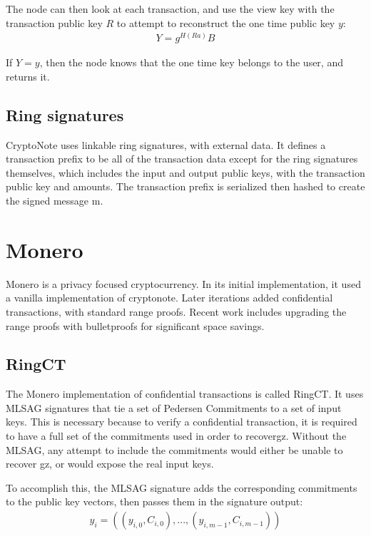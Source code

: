 \documentclass{article}
\begin{document}
The node can then look at each transaction, and use the view key with the transaction public key $R$ to attempt to reconstruct the one time public key $y$:
\begin{eqnarray}
  Y = g^{H(Ra)} B
\end{eqnarray}

If $Y = y$, then the node knows that the one time key belongs to the user, and returns it.


\subsection{Ring signatures}

CryptoNote uses linkable ring signatures, with external data.  It defines a transaction prefix to be all of the transaction data except for the ring signatures themselves, which includes the input and output public keys, with the transaction public key and amounts.  The transaction prefix is serialized then hashed to create the signed message m.



\section{Monero}

Monero is a privacy focused cryptocurrency.  In its initial implementation, it used a vanilla implementation of cryptonote.  Later iterations added confidential transactions, with standard range proofs.  Recent work includes upgrading the range proofs with bulletproofs for significant space savings.


\subsection{RingCT}

The Monero implementation of confidential transactions is called RingCT.  It uses MLSAG signatures that tie a set of Pedersen Commitments to a set of input keys.  This is necessary because to verify a confidential transaction, it is required to have a full set of the commitments used in order to recovergz.  Without the MLSAG, any attempt to include the commitments would either be unable to recover gz, or would expose the real input keys.

To accomplish this, the MLSAG signature adds the corresponding commitments to the public key vectors, then passes them in the signature output:
\begin{eqnarray}
  y_i = ((y_{i,0}, C_{i,0}), ..., (y_{i,m-1}, C_{i,m-1}))
\end{eqnarray}
\end{document}
